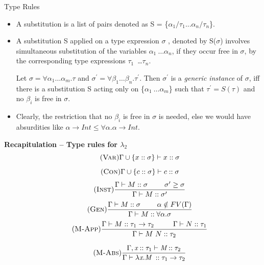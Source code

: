 \documentclass{beamer}
\begin{document}
\begin{frame}[fragile]{Type Rules}
\begin{itemize}
\item A substitution is a list of pairs denoted as S = \{$\alpha_1 / \tau_1 . . .\alpha_n/\tau_n$\}.
\item A substitution S applied on a type expression $\sigma$ , denoted by S($\sigma$)
involves simultaneous substitution of the variables $\alpha_1\ \dots \alpha_n$, if they occur free in $\sigma$, by the corresponding type expressions $\tau_1$\ \dots$\tau_n$.

\begin{definition}
Let $\sigma = \forall\alpha_1\dots\alpha_m$.$\tau$ and $\sigma^{\prime} = \forall\beta_1\dots\beta_n$.$\tau^{\prime}$. Then $\sigma^{\prime}$ is a \textit{generic instance} of $\sigma$, iff there is a substitution S acting only on \{$\alpha_1\ \dots\alpha_m$\}
such that $\tau^{\prime} = S(\tau)$ and no $\beta_i$ is free in $\sigma$.
\end{definition}
\item Clearly, the restriction that no $\beta_i$ is free in $\sigma$ is needed, else we would have absurdities like $\alpha\rightarrow Int \leq\forall\alpha.\alpha\rightarrow Int$.
\end{itemize}
\end{frame}

\begin{frame}[fragile]{\bf Recapitulation – Type rules for $\lambda_2$}
\begin{equation}\tag{\textsc{Var}}
\Gamma \cup \{x :: \sigma\} \vdash x :: \sigma
\end{equation}
\begin{equation}\tag{\textsc{Con}}
\Gamma \cup \{c :: \sigma\} \vdash c :: \sigma 
\end{equation}
\begin{equation}\tag{\textsc{Inst}}
\frac{\Gamma \vdash M :: \sigma\ \ \ \ \ \ \ \sigma^{\prime}\geq\sigma}{\Gamma \vdash M :: \sigma^{\prime}}
\end{equation}
\begin{equation}\tag{\textsc{Gen}}
\frac{\Gamma \vdash M :: \sigma\ \ \ \ \ \ \ \alpha \notin FV(\Gamma)}{\Gamma \vdash M :: \forall\alpha.\sigma}
\end{equation}
\begin{equation}\tag{\textsc{M-App}}
\frac{\Gamma \vdash M :: \tau_1\rightarrow\tau_2\ \ \ \ \ \ \ \ \Gamma \vdash N :: \tau_1}{\Gamma \vdash M\ N :: \tau_2}
\end{equation}

\begin{equation}\tag{\textsc{M-Abs}}
\frac{\Gamma,\textit{x} :: \tau_1 \vdash \textit{M} :: \tau_2}{\Gamma \vdash \lambda\textit{x.M}\ :: \tau_1\rightarrow\tau_2}
\end{equation}

\end{frame}
\end{document}
